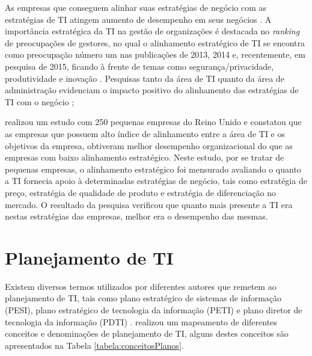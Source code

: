 As empresas que conseguem alinhar suas estratégias de negócio com as estratégias de TI atingem aumento de desempenho em seus negócios \cite{chan:06}. A importância estratégica da TI na gestão de organizações é destacada no \textit{ranking} de preocupações de gestores, no qual o alinhamento estratégico de TI se encontra como preocupação número um nas publicações de 2013, 2014 e, recentemente, em pesquisa de 2015, ficando à frente de temas como segurança/privacidade, produtividade e inovação  \cite{kappelman:15}. Pesquisas tanto da área de TI quanto da área de administração evidenciam o impacto positivo do alinhamento das estratégias de TI com o negócio \cite{reich:96,luftman:96,sabherwal:01};

 realizou um estudo com 250 pequenas empresas do Reino Unido e constatou que as empresas que possuem alto índice de alinhamento entre a área de TI e os objetivos da empresa, obtiveram melhor desempenho organizacional do que as empresas com baixo alinhamento estratégico. Neste estudo, por se tratar de pequenas empresas, o alinhamento estratégico foi mensurado avaliando o quanto a TI fornecia apoio à determinadas estratégias de negócio, tais como estratégia de preço, estratégia de qualidade de produto e estratégia de diferenciação no mercado. O resultado da pesquisa verificou que quanto mais presente a TI era nestas estratégias das empresas, melhor era o desempenho das mesmas.

\section{Planejamento de TI}

Existem diversos termos utilizados por diferentes autores que remetem ao planejamento de TI, tais como plano estratégico de sistemas de informação (PESI), plano estratégico de tecnologia da informação (PETI) e plano diretor de tecnologia da informação (PDTI) \cite{rezende:08}.  realizou um mapeamento de diferentes conceitos e denominações de planejamento de TI, alguns destes conceitos são apresentados na Tabela \ref{tabela:conceitosPlanos}.


